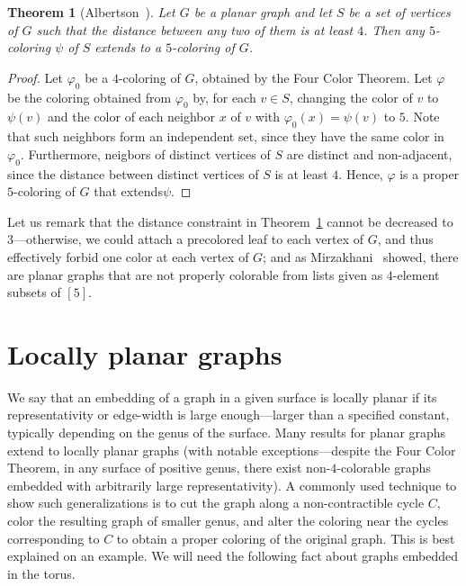 \documentclass[12pt,twoside,openright,a4paper]{book}
\newtheorem{theorem}{Theorem}[chapter]
\begin{document}
\begin{theorem}[Albertson~\cite{Alb98}]\label{thm:extend-dist4}
Let $G$ be a planar graph and let $S$ be a set of vertices of $G$ such that the distance between any two
of them is at least $4$.  Then any $5$-coloring $\psi$ of $S$ extends to a $5$-coloring of $G$.
\end{theorem}
\begin{proof}
Let $\varphi_0$ be a $4$-coloring of $G$, obtained by the Four Color Theorem.  Let $\varphi$ be the coloring obtained from $\varphi_0$
by, for each $v\in S$, changing the color of $v$ to $\psi(v)$ and the color of each neighbor $x$ of $v$ with $\varphi_0(x)=\psi(v)$ to $5$.
Note that such neighbors form an independent set, since they have the same color in $\varphi_0$.  Furthermore, neigbors of distinct
vertices of $S$ are distinct and non-adjacent, since the distance between distinct vertices of $S$ is at least $4$.
Hence, $\varphi$ is a proper $5$-coloring of $G$ that extends$\psi$.
\end{proof}
Let us remark that the distance constraint in Theorem~\ref{thm:extend-dist4} cannot be decreased to $3$---otherwise, we could attach a precolored
leaf to each vertex of $G$, and thus effectively forbid one color at each vertex of $G$; and as Mirzakhani~\cite{mirzakhani1996small} showed,
there are planar graphs that are not properly colorable from lists given as $4$-element subsets of $[5]$.

\section{Locally planar graphs}

We say that an embedding of a graph in a given surface is locally planar if its representativity or edge-width is large enough---larger
than a specified constant, typically depending on the genus of the surface.  Many results for planar graphs extend to locally planar graphs (with notable
exceptions---despite the Four Color Theorem, in any surface of positive genus, there exist non-$4$-colorable graphs embedded with arbitrarily large representativity).
A commonly used technique to show such generalizations is to cut the graph along a non-contractible cycle $C$, color the resulting graph of smaller genus,
and alter the coloring near the cycles corresponding to $C$ to obtain a proper coloring of the original graph.  This is best explained on an example.
We will need the following fact about graphs embedded in the torus.
\end{document}
